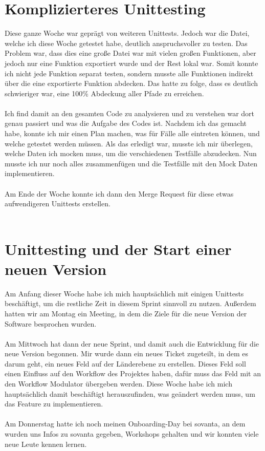 \section{Komplizierteres Unittesting}
Diese ganze Woche war geprägt von weiteren Unittests. Jedoch war die Datei, welche ich diese Woche getestet habe, deutlich anspruchsvoller zu testen. Das Problem war, dass dies eine große Datei war mit vielen großen Funktionen, aber jedoch nur eine Funktion exportiert wurde und der Rest lokal war. Somit konnte ich nicht jede Funktion separat testen, sondern musste alle Funktionen indirekt über die eine exportierte Funktion abdecken. Das hatte zu folge, dass es deutlich schwieriger war, eine 100\% Abdeckung aller Pfade zu erreichen. \\\\
Ich find damit an den gesamten Code zu analysieren und zu verstehen war dort genau passiert und was die Aufgabe des Codes ist. Nachdem ich das gemacht habe, konnte ich mir einen Plan machen, was für Fälle alle eintreten können, und welche getestet werden müssen. Als das erledigt war, musste ich mir überlegen, welche Daten ich mocken muss, um die verschiedenen Testfälle abzudecken. Nun musste ich nur noch alles zusammenfügen und die Testfälle mit den Mock Daten implementieren. \\\\
Am Ende der Woche konnte ich dann den Merge Request für diese etwas aufwendigeren Unittests erstellen. \\\\

\section{Unittesting und der Start einer neuen Version}
Am Anfang dieser Woche habe ich mich hauptsächlich mit einigen Unittests beschäftigt, um die restliche Zeit in diesem Sprint sinnvoll zu nutzen. Außerdem hatten wir am Montag ein Meeting, in dem die Ziele für die neue Version der Software besprochen wurden. \\\\
Am Mittwoch hat dann der neue Sprint, und damit auch die Entwicklung für die neue Version begonnen. Mir wurde dann ein neues Ticket zugeteilt, in dem es darum geht, ein neues Feld auf der Länderebene zu erstellen. Dieses Feld soll einen Einfluss auf den Workflow des Projektes haben, dafür muss das Feld mit an den Workflow Modulator übergeben werden. Diese Woche habe ich mich hauptsächlich damit beschäftigt herauszufinden, was geändert werden muss, um das Feature zu implementieren. \\\\
Am Donnerstag hatte ich noch meinen Onboarding-Day bei sovanta, an dem wurden uns Infos zu sovanta gegeben, Workshops gehalten und wir konnten viele neue Leute kennen lernen. \\\\

